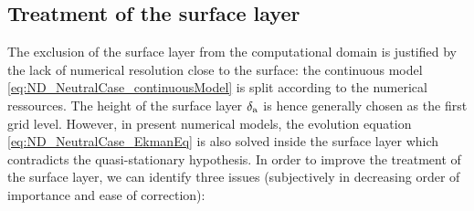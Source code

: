 \subsection{Treatment of the surface layer}
\label{sec:ND_Intro_treatmentSL}
The exclusion of the surface layer from the computational
domain is justified by the lack of numerical resolution
close to the surface: the continuous model
\eqref{eq:ND_NeutralCase_continuousModel} is split
according to the numerical ressources. The height
of the surface layer $\delta_{\rm a}$ is hence generally chosen as the
first grid level.
However, in present numerical models,
the evolution equation \eqref{eq:ND_NeutralCase_EkmanEq}
is also solved inside the surface layer which contradicts the
quasi-stationary hypothesis.
In order to improve the treatment of the surface layer,
we can identify three issues (subjectively in decreasing
order of importance and ease of correction):
